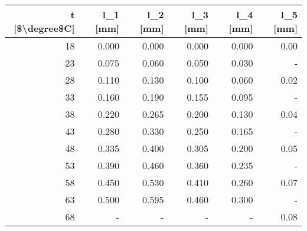 \begin{tabular}{rrrrrr}
\toprule
 t [\$\textbackslash degree\$C] &  l\_1 [mm] &  l\_2 [mm] &  l\_3 [mm] &  l\_4 [mm] &  l\_5 [mm] \\
\midrule
             18 &     0.000 &     0.000 &     0.000 &     0.000 &      0.00 \\
             23 &     0.075 &     0.060 &     0.050 &     0.030 &         - \\
             28 &     0.110 &     0.130 &     0.100 &     0.060 &      0.02 \\
             33 &     0.160 &     0.190 &     0.155 &     0.095 &         - \\
             38 &     0.220 &     0.265 &     0.200 &     0.130 &      0.04 \\
             43 &     0.280 &     0.330 &     0.250 &     0.165 &         - \\
             48 &     0.335 &     0.400 &     0.305 &     0.200 &      0.05 \\
             53 &     0.390 &     0.460 &     0.360 &     0.235 &         - \\
             58 &     0.450 &     0.530 &     0.410 &     0.260 &      0.07 \\
             63 &     0.500 &     0.595 &     0.460 &     0.300 &         - \\
             68 &         - &         - &         - &         - &      0.08 \\
\bottomrule
\end{tabular}
